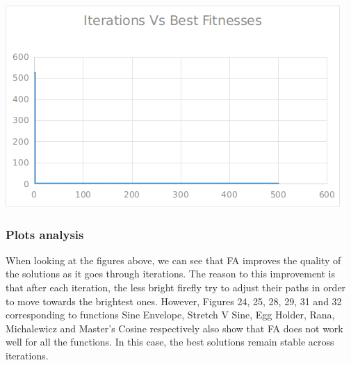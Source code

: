 \documentclass[12pt]{article}
\begin{document}
					\hfill
					\begin{minipage}{0.6\linewidth}
						\includegraphics[width=\linewidth]{36.png}
					\end{minipage}
			
				\subsubsection{Plots analysis}
					When looking at the figures above, we can see that FA improves the quality of the solutions as it goes through iterations. The reason to this improvement is that after each iteration, the less bright firefly try to adjust their paths in order to move towards the brightest ones. However, Figures 24, 25, 28, 29, 31 and 32 corresponding to functions Sine Envelope, Stretch V Sine, Egg Holder, Rana, Michalewicz and Master's Cosine respectively also show that FA does not work well for all the functions. In this case, the best solutions remain stable across iterations.
				
\end{document}
